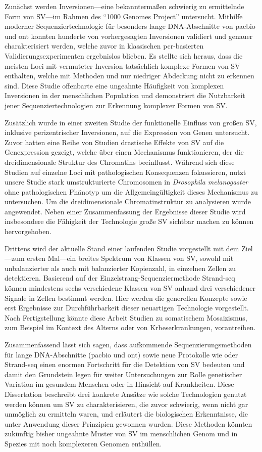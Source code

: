 Zunächst werden Inversionen--–eine bekanntermaßen schwierig zu ermittelnde Form
von SV---im Rahmen des ``1000 Genomes Project'' untersucht. Mithilfe moderner
Sequenziertechnologie für besonders lange DNA\--Ab\-schnit\-te von \acl{pacbio}
und \acl{ont} konnten hunderte von vorhergesagten Inversionen validiert und
genauer cha\-rak\-te\-ri\-siert werden, welche zuvor in klassischen \acs{pcr}-basierten
Validierungsexperimenten ergebnislos blieben. Es stellte sich heraus, dass die
meis\-ten Loci mit vermuteter Inversion tatsächlich komplexe Formen von SV
enthalten, welche mit \mps Methoden und nur niedriger Abdeckung nicht zu
erkennen sind. Diese Studie offenbarte eine ungeahnte Häufigkeit von komplexen
Inversionen in der menschlichen Population und demonstriert die Nutzbarkeit
jener Sequenziertechnologien zur Erkennung komplexer Formen von SV.

Zusätzlich wurde in einer zweiten Studie der funktionelle Einfluss von großen SV,
inklusive perizentrischer Inversionen, auf die Expression von Genen untersucht.
Zuvor hatten eine Reihe von Studien drastische Effekte von SV auf die
Genexpression gezeigt, welche über einen Mechanismus funktionieren, der die
dreidimensionale Struktur des Chromatins beeinflusst. Während sich diese Studien
auf einzelne Loci mit pathologischen Konsequenzen fokussieren, nutzt unsere
Studie stark umstrukturierte Chromosomen in \textit{Drosophila melanogaster}
ohne pathologischen Phänotyp um die Allgemeingültigkeit dieses Mechanismus zu
untersuchen. Um die dreidimensionale Chromatinstruktur zu analysieren wurde \hic
angewendet. Neben einer Zusammenfassung der Ergebnisse dieser Studie wird
insbesondere die Fähigkeit der \hic Technologie große SV sichtbar machen zu
können hervorgehoben.

Drittens wird der aktuelle Stand einer laufenden Studie vorgestellt mit dem
Ziel---zum ersten Mal---ein breites Spektrum von Klassen von SV, sowohl mit unbalanzierter
als auch mit balanzierter Kopienzahl, in einzelnen Zellen zu detektieren.
Basierend auf der Ein\-zel\-strang-Se\-quen\-zier\-me\-tho\-de Strand-seq können
mindestens sechs verschiedene Klas\-sen von SV anhand drei verschiedener Signale
in Zellen bestimmt werden. Hier werden die generellen Konzepte sowie erst
Ergebnisse zur Durchführbarkeit dieser neuartigen Technologie
vorgestellt. Nach Fertigstellung könnte diese Arbeit Studien zu somatischem
Mosaizismus, zum Beispiel im Kontext des Alterns oder von Krbeserkrankungen,
vorantreiben.

Zusammenfassend lässt sich sagen, dass aufkommende Sequenzierungsmethoden für
lange DNA-Ab\-schnit\-te (\acl{pacbio} und \acl{ont}) sowie neue Protokolle wie
\hic oder Strand-seq einen enormen Fortschritt für die Detektion von SV bedeuten
und damit den Grundstein legen für weiter Untersuchungen zur Rolle genetischer
Variation im gesundem Menschen oder in Hinsicht auf Krankheiten. Diese
Dissertation beschreibt drei konkrete Ansätze wie solche Technologien genutzt
werden können um SV zu charakterisieren, die zuvor schwierig, wenn nicht gar
unmöglich zu ermitteln waren, und erläutert die biologischen Erkenntnisse, die
unter Anwendung dieser Prinzipien gewonnen wurden. Diese Methoden könnten
zukünftig bisher ungeahnte Muster von SV im menschlichen Genom und in Spezies
mit noch komplexeren Genomen enthüllen.
